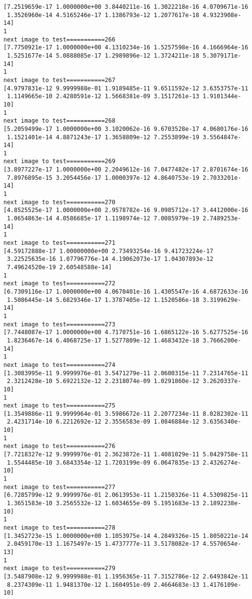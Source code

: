 \documentclass[11pt]{article}
\begin{document}
\begin{Verbatim}[commandchars=\\\{\}]
[7.2519659e-17 1.0000000e+00 3.8440211e-16 1.3022218e-16 4.0709671e-16
 1.3526960e-14 4.5165246e-17 1.1386793e-12 1.2077617e-18 4.9323908e-14]
1
next image to test===========266
[7.7750921e-17 1.0000000e+00 4.1310234e-16 1.5257598e-16 4.1666964e-16
 1.5251677e-14 5.0888085e-17 1.2989896e-12 1.3724211e-18 5.3079171e-14]
1
next image to test===========267
[4.9797831e-12 9.9999988e-01 1.9189485e-11 9.6511592e-12 3.6353757e-11
 1.1149665e-10 2.4280591e-12 1.5668381e-09 3.1517261e-13 1.9101344e-10]
1
next image to test===========268
[5.2059499e-17 1.0000000e+00 3.1020062e-16 9.6703528e-17 4.0680176e-16
 1.1521401e-14 4.8871243e-17 1.3658809e-12 7.2553899e-19 3.5564847e-14]
1
next image to test===========269
[3.8977227e-17 1.0000000e+00 2.2049612e-16 7.0477482e-17 2.8701674e-16
 7.8976895e-15 3.2054456e-17 1.0000397e-12 4.8640753e-19 2.7033201e-14]
1
next image to test===========270
[4.8525525e-17 1.0000000e+00 2.9578782e-16 9.0985712e-17 3.4412000e-16
 1.0654863e-14 4.0586685e-17 1.1198974e-12 7.0085979e-19 2.7489253e-14]
1
next image to test===========271
[4.59172888e-17 1.00000000e+00 2.73493254e-16 9.41723224e-17
 3.22525635e-16 1.07796776e-14 4.19062073e-17 1.04307893e-12
 7.49624520e-19 2.60548588e-14]
1
next image to test===========272
[6.7309116e-17 1.0000000e+00 4.0670401e-16 1.4305547e-16 4.6872633e-16
 1.5086445e-14 5.6829346e-17 1.3787405e-12 1.1520586e-18 3.3199629e-14]
1
next image to test===========273
[7.7448087e-17 1.0000000e+00 4.7170751e-16 1.6865122e-16 5.6277525e-16
 1.8236467e-14 6.4068725e-17 1.5277809e-12 1.4683432e-18 3.7666200e-14]
1
next image to test===========274
[1.3083995e-11 9.9999976e-01 3.5471279e-11 2.0600315e-11 7.2314765e-11
 2.3212428e-10 5.6922132e-12 2.2318074e-09 1.0291860e-12 3.2620337e-10]
1
next image to test===========275
[1.3549886e-11 9.9999964e-01 3.5986672e-11 2.2077234e-11 8.0282302e-11
 2.4231714e-10 6.2212692e-12 2.3556583e-09 1.0846884e-12 3.6356340e-10]
1
next image to test===========276
[7.7218327e-12 9.9999976e-01 2.3623872e-11 1.4081029e-11 5.0429758e-11
 1.5544485e-10 3.6843354e-12 1.7203199e-09 6.0647835e-13 2.4326274e-10]
1
next image to test===========277
[6.7285799e-12 9.9999976e-01 2.0613953e-11 1.2150326e-11 4.5309825e-11
 1.3651583e-10 3.2565532e-12 1.6034655e-09 5.1951683e-13 2.1892238e-10]
1
next image to test===========278
[1.3452723e-15 1.0000000e+00 1.1053975e-14 4.2849326e-15 1.8050221e-14
 2.0459170e-13 1.1675497e-15 1.4737777e-11 3.5178082e-17 4.5570654e-13]
1
next image to test===========279
[3.5487908e-12 9.9999988e-01 1.1956365e-11 7.3152786e-12 2.6493842e-11
 8.2374309e-11 1.9481370e-12 1.1604951e-09 2.4664683e-13 1.4176109e-10]

\end{Verbatim}
\end{document}
